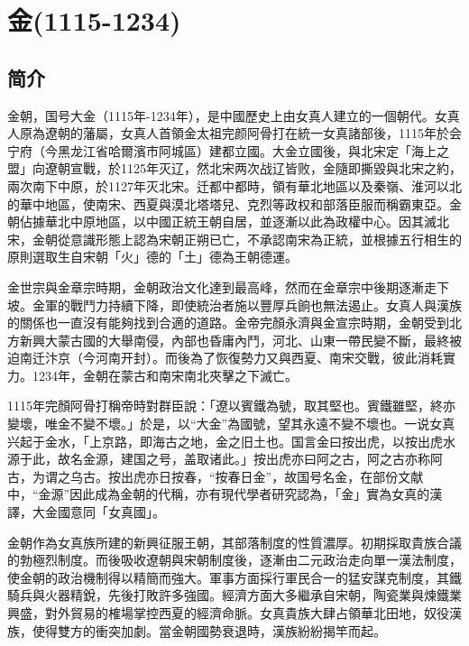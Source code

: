 
\chapter{金\tiny(1115-1234)}

\section{简介}

金朝，国号大金（1115年-1234年），是中國歷史上由女真人建立的一個朝代。女真人原為遼朝的藩屬，女真人首領金太祖完颜阿骨打在統一女真諸部後，1115年於会宁府（今黑龙江省哈爾濱市阿城區）建都立國。大金立國後，與北宋定「海上之盟」向遼朝宣戰，於1125年灭辽，然北宋两次战辽皆败，金隨即撕毀與北宋之約，兩次南下中原，於1127年灭北宋。迁都中都時，領有華北地區以及秦嶺、淮河以北的華中地區，使南宋、西夏與漠北塔塔兒、克烈等政权和部落臣服而稱霸東亞。金朝佔據華北中原地區，以中國正統王朝自居，並逐漸以此為政權中心。因其滅北宋，金朝從意識形態上認為宋朝正朔已亡，不承認南宋為正統，並根據五行相生的原則選取生自宋朝「火」德的「土」德為王朝德運。

金世宗與金章宗時期，金朝政治文化達到最高峰，然而在金章宗中後期逐漸走下坡。金軍的戰鬥力持續下降，即使統治者施以豐厚兵餉也無法遏止。女真人與漢族的關係也一直沒有能夠找到合適的道路。金帝完顏永濟與金宣宗時期，金朝受到北方新興大蒙古國的大舉南侵，內部也昏庸內鬥，河北、山東一帶民變不斷，最終被迫南迁汴京（今河南开封）。而後為了恢復勢力又與西夏、南宋交戰，彼此消耗實力。1234年，金朝在蒙古和南宋南北夾擊之下滅亡。

1115年完顏阿骨打稱帝時對群臣說：「遼以賓鐵為號，取其堅也。賓鐵雖堅，終亦變壞，唯金不變不壞。」於是，以“大金”為國號，望其永遠不變不壞也。一说女真兴起于金水，「上京路，即海古之地，金之旧土也。国言金曰按出虎，以按出虎水源于此，故名金源，建国之号，盖取诸此。」按出虎亦曰阿之古，阿之古亦称阿古，为谓之乌古。按出虎亦日按春，“按春日金”，故国号名金，在部份文献中，“金源”因此成為金朝的代稱，亦有現代學者研究認為，「金」實為女真的漢譯，大金國意同「女真國」。

金朝作為女真族所建的新興征服王朝，其部落制度的性質濃厚。初期採取貴族合議的勃極烈制度。而後吸收遼朝與宋朝制度後，逐漸由二元政治走向單一漢法制度，使金朝的政治機制得以精簡而強大。軍事方面採行軍民合一的猛安謀克制度，其鐵騎兵與火器精銳，先後打敗許多強國。經濟方面大多繼承自宋朝，陶瓷業與煉鐵業興盛，對外貿易的榷場掌控西夏的經濟命脈。女真貴族大肆占領華北田地，奴役漢族，使得雙方的衝突加劇。當金朝國勢衰退時，漢族紛紛揭竿而起。

